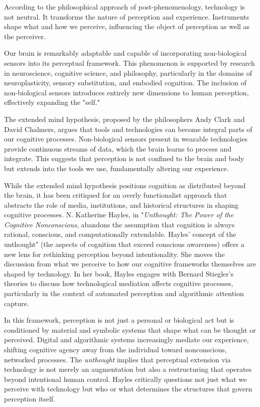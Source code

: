 According to the philosophical approach of post-phenomenology, technology is not neutral. It transforms the nature of perception and experience. Instruments shape what and how we perceive, influencing the object of perception as well as the perceiver.

Our brain is remarkably adaptable and capable of incorporating non-biological sensors into its perceptual framework. This phenomenon is supported by research in neuroscience, cognitive science, and philosophy, particularly in the domains of neuroplasticity, sensory substitution, and embodied cognition. The inclusion of non-biological sensors introduces entirely new dimensions to human perception, effectively expanding the "self."

The extended mind hypothesis, proposed by the philosophers Andy Clark and David Chalmers, argues that tools and technologies can become integral parts of our cognitive processes. Non-biological sensors present in wearable technologies provide continuous streams of data, which the brain learns to process and integrate. This suggests that perception is not confined to the brain and body but extends into the tools we use, fundamentally altering our experience.

While the extended mind hypothesis positions cognition as distributed beyond the brain, it has been critiqued for an overly functionalist approach that abstracts the role of media, institutions, and historical structures in shaping cognitive processes. N. Katherine Hayles, in "\textit{Unthought: The Power of the Cognitive Nonconscious}, abandons the assumption that cognition is always rational, conscious, and computationally extendable. Hayles' concept of the unthought" (the aspects of cognition that exceed conscious awareness) offers a new lens for rethinking perception beyond intentionality. She moves the discussion from what we perceive to how our cognitive frameworks themselves are shaped by technology. In her book, Hayles engages with Bernard Stiegler's theories to discuss how technological mediation affects cognitive processes, particularly in the context of automated perception and algorithmic attention capture.

In this framework, perception is not just a personal or biological act but is conditioned by material and symbolic systems that shape what can be thought or perceived. Digital and algorithmic systems increasingly mediate our experience, shifting cognitive agency away from the individual toward nonconscious, networked processes. The \textit{unthought} implies that perceptual extension via technology is not merely an augmentation but also a restructuring that operates beyond intentional human control. Hayles critically questions not just what we perceive with technology but who or what determines the structures that govern perception itself.

